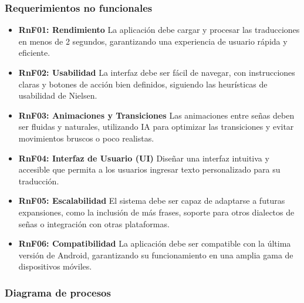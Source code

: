 \subsubsection{Requerimientos no funcionales}
\begin{itemize}
    \item \textbf{RnF01: Rendimiento}  
    La aplicación debe cargar y procesar las traducciones en menos de 2 segundos, garantizando una experiencia de usuario rápida y eficiente.
    
    \item \textbf{RnF02: Usabilidad}  
    La interfaz debe ser fácil de navegar, con instrucciones claras y botones de acción bien definidos, siguiendo las heurísticas de usabilidad de Nielsen.

	 \item \textbf{RnF03: Animaciones y Transiciones}  
    Las animaciones entre señas deben ser fluidas y naturales, utilizando IA para optimizar las transiciones y evitar movimientos bruscos o poco realistas.
    
    \item \textbf{RnF04: Interfaz de Usuario (UI)}  
    Diseñar una interfaz intuitiva y accesible que permita a los usuarios ingresar texto personalizado para su traducción.

    \item \textbf{RnF05: Escalabilidad}  
    El sistema debe ser capaz de adaptarse a futuras expansiones, como la inclusión de más frases, soporte para otros dialectos de señas o integración con otras plataformas.

	\item \textbf{RnF06: Compatibilidad}  
    La aplicación debe ser compatible con la última versión de Android, garantizando su funcionamiento en una amplia gama de dispositivos móviles.
\end{itemize}

\subsubsection{Diagrama de procesos}
\begin{center}
\end{center}

